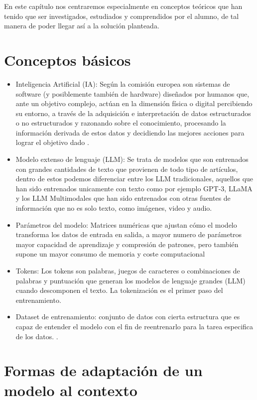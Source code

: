 En este capítulo nos centraremos especialmente en conceptos teóricos que  han tenido que ser investigados, estudiados y comprendidos por el alumno, de tal manera de poder llegar así a la solución planteada.
\section{Conceptos básicos}
\begin{itemize}
    \item Inteligencia Artificial (IA): Según la comisión europea son sistemas de software (y posiblemente también de hardware) diseñados por humanos que, ante un objetivo complejo, actúan en la dimensión física o digital percibiendo su entorno, a través de la adquisición e interpretación de datos estructurados o no estructurados y razonando sobre el conocimiento, procesando la información derivada de estos datos y decidiendo las mejores acciones para lograr el objetivo dado \cite{definicionIA}.
    \item Modelo extenso de lenguaje (LLM): Se trata de modelos que son entrenados con grandes cantidades de texto que provienen de todo tipo de artículos, dentro de estos podemos diferenciar entre los LLM tradicionales, aquellos que han sido entrenados unicamente con texto como por ejemplo GPT-3, LLaMA y los LLM Multimodales que han sido entrenados con otras fuentes de información que no es solo texto, como imágenes, video y audio.
    \item Parámetros del modelo: Matrices numéricas que ajustan cómo el modelo  transforma los datos de entrada en salida, a mayor numero de parámetros mayor capacidad de aprendizaje y compresión de patrones, pero también supone un mayor consumo de memoria y coste computacional
    \item Tokens: Los tokens son palabras, juegos de caracteres o combinaciones de palabras y puntuación que generan los modelos de lenguaje grandes (LLM) cuando descomponen el texto. La tokenización es el primer paso del entrenamiento.
    \item Dataset de entrenamiento: conjunto de datos con cierta estructura que es capaz de entender el modelo con el fin de reentrenarlo para la tarea especifica de los datos.
.
\end{itemize}

\section{Formas de adaptación de un modelo al contexto}

